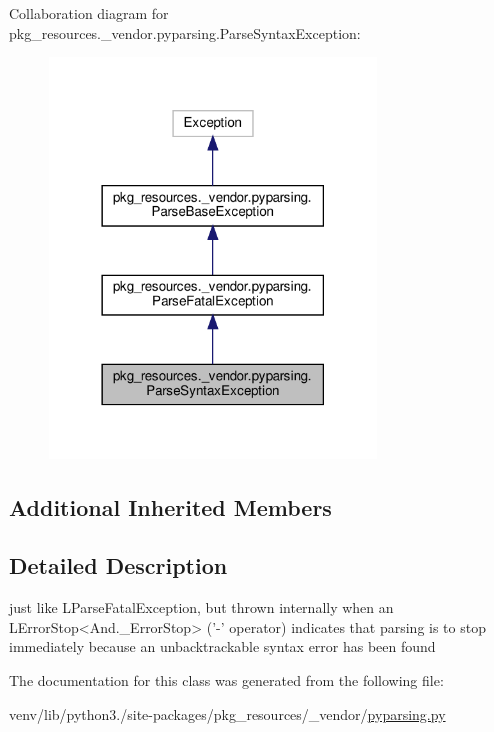 Collaboration diagram for pkg\+\_\+resources.\+\_\+vendor.\+pyparsing.\+Parse\+Syntax\+Exception\+:
\nopagebreak
\begin{figure}[H]
\begin{center}
\leavevmode
\includegraphics[width=246pt]{classpkg__resources_1_1__vendor_1_1pyparsing_1_1ParseSyntaxException__coll__graph}
\end{center}
\end{figure}
\subsection*{Additional Inherited Members}


\subsection{Detailed Description}
\begin{DoxyVerb}just like L{ParseFatalException}, but thrown internally when an
   L{ErrorStop<And._ErrorStop>} ('-' operator) indicates that parsing is to stop 
   immediately because an unbacktrackable syntax error has been found\end{DoxyVerb}
 

The documentation for this class was generated from the following file\+:\begin{DoxyCompactItemize}
\item 
venv/lib/python3./site-\/packages/pkg\+\_\+resources/\+\_\+vendor/\hyperlink{pkg__resources_2__vendor_2pyparsing_8py}{pyparsing.\+py}\end{DoxyCompactItemize}
